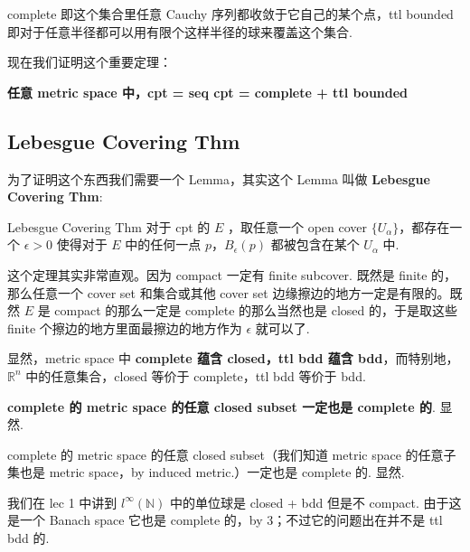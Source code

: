 \begin{remark}
complete 即这个集合里任意 Cauchy 序列都收敛于它自己的某个点，ttl bounded 即对于任意半径都可以用有限个这样半径的球来覆盖这个集合.
\end{remark}



现在我们证明这个重要定理：
\begin{theorem}
    \textbf{任意 metric space 中，cpt = seq cpt = complete + ttl bounded}
\end{theorem}

\subsection{Lebesgue Covering Thm}
为了证明这个东西我们需要一个 Lemma，其实这个 Lemma 叫做 \textbf{Lebesgue Covering Thm}:  
\begin{lemma}{Lebesgue Covering Thm} \label{lbg covering thm}
    对于 cpt 的 $E$ ，取任意一个 open cover $\{U_{\alpha}\}$，都存在一个 $\epsilon > 0$ 使得对于 $E$ 中的任何一点 $p$，$B_{\epsilon}(p)$ 都被包含在某个 $U_{\alpha}$ 中.
\end{lemma}
\proof 这个定理其实非常直观。因为 compact 一定有 finite subcover. 既然是 finite 的，那么任意一个 cover set 和集合或其他 cover set 边缘擦边的地方一定是有限的。既然 $E$ 是 compact 的那么一定是 complete 的那么当然也是 closed 的，于是取这些 finite 个擦边的地方里面最擦边的地方作为 $\epsilon$ 就可以了.

\begin{remark}
    显然，metric space 中 \textbf{complete 蕴含 closed，ttl bdd 蕴含 bdd}，而特别地， $\mathbb{R}^n$ 中的任意集合，closed 等价于 complete，ttl bdd 等价于 bdd.
\end{remark}

\begin{theorem}
    \textbf{complete 的 metric space 的任意 closed subset 一定也是 complete 的}. 显然.
\end{theorem}
complete 的 metric space 的任意 closed subset（我们知道 metric space 的任意子集也是 metric space，by induced metric.）一定也是 complete 的. 显然.

\begin{remark}
    我们在 lec 1 中讲到  $l^{\infty}(\mathbb{N})$ 中的单位球是 closed + bdd 但是不 compact. 由于这是一个 Banach space 它也是 complete 的，by 3；不过它的问题出在并不是 ttl bdd 的.
\end{remark}


